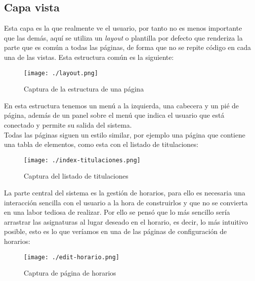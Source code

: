 \subsection{Capa vista}

Esta capa es la que realmente ve el usuario, por tanto no es menos importante que las demás, aquí se utiliza un {\em layout} o plantilla por defecto que renderiza la parte que es común a todas las páginas, de forma que no se repite código en cada una de las vistas. Esta estructura común es la siguiente:

\begin{figure}[H] 
  \label{captura-layout} 
	\begin{center}
    \texttt{[image: ./layout.png]}
  \end{center}
\caption{Captura de la estructura de una página}
\end{figure}

En esta estructura tenemos un menú a la izquierda, una cabecera y un pié de página, además de un panel sobre el menú que indica el usuario que está conectado y permite su salida del sistema.\\

Todas las páginas siguen un estilo similar, por ejemplo una página que contiene una tabla de elementos, como esta con el listado de titulaciones:

\begin{figure}[H] 
  \label{captura-index-titulaciones} 
	\begin{center}
    \texttt{[image: ./index-titulaciones.png]}
  \end{center}
\caption{Captura del listado de titulaciones}
\end{figure}

La parte central del sistema es la gestión de horarios, para ello es necesaria una interacción sencilla con el usuario a la hora de construirlos y que no se convierta en una labor tediosa de realizar. Por ello se pensó que lo más sencillo sería arrastrar las asignaturas al lugar deseado en el horario, es decir, lo más intuitivo posible, esto es lo que veríamos en una de las páginas de configuración de horarios:

\begin{figure}[H] 
  \label{captura-horarios} 
	\begin{center}
    \texttt{[image: ./edit-horario.png]}
  \end{center}
\caption{Captura de página de horarios}
\end{figure}


